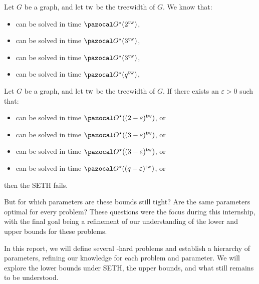 \begin{theorem}
    \label{theorem:treewidth-algo}
    Let $G$ be a graph, and let $\text{tw}$ be the treewidth of $G$. We know that:
    \begin{itemize}
        \item {} can be solved in time $\O^\star(2^{\tw})$,
        \item {} can be solved in time $\O^\star(3^{\tw})$,
        \item {} can be solved in time $\O^\star(3^{\tw})$,
        \item {} can be solved in time $\O^\star(q^{\tw})$,
    \end{itemize}
\end{theorem}

\begin{theorem}
    \label{theorem:treewidth-bound}
    Let $G$ be a graph, and let $\text{tw}$ be the treewidth of $G$. If there exists an $\varepsilon > 0$ such that:
    \begin{itemize}
        \item {} can be solved in time $\O^\star((2-\varepsilon)^{\tw})$, or
        \item {} can be solved in time $\O^\star((3-\varepsilon)^{\tw})$, or
        \item {} can be solved in time $\O^\star((3-\varepsilon)^{\tw})$, or
        \item {} can be solved in time $\O^\star((q-\varepsilon)^{\tw})$, or
    \end{itemize}
    then the SETH fails.
\end{theorem}


But for which parameters are these bounds still tight? Are the same parameters optimal for every problem? These questions were the focus during this internship, with the final goal being a refinement of our understanding of the lower and upper bounds for these problems.

In this report, we will define several \NP-hard problems and establish a hierarchy of parameters, refining our knowledge for each problem and parameter. We will explore the lower bounds under SETH, the upper bounds, and what still remains to be understood.
